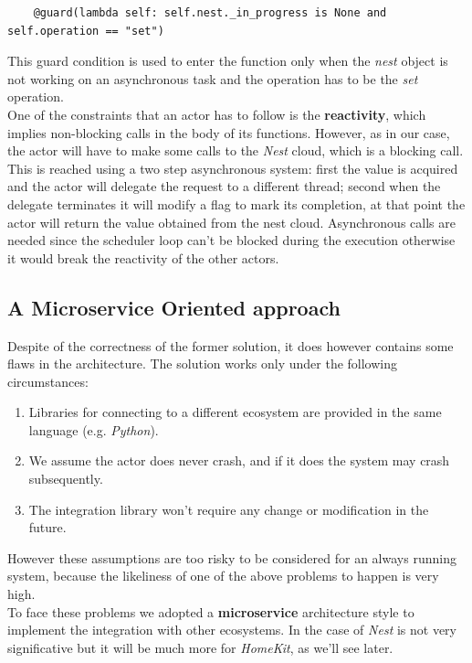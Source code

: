 \begin{verbatim}
    @guard(lambda self: self.nest._in_progress is None and self.operation == "set")
\end{verbatim}
This guard condition is used to enter the function only when the \textit{nest} object is not
working on an asynchronous task and the operation has to be the \textit{set} operation.\\
One of the constraints that an actor has to follow is the \textbf{reactivity}, which implies
non-blocking calls in the body of its functions. However, as in our case, the actor will have to
make some calls to the \textit{Nest} cloud, which is a blocking call. This is reached
using a two step asynchronous system: first the value is acquired and the actor
will delegate the request to a different thread; second when the delegate terminates it will
modify a flag to mark its completion, at that point the actor will return the value obtained
from the nest cloud. Asynchronous calls are needed since the scheduler loop can't be blocked
during the execution otherwise it would break the reactivity of the other actors.

\subsection{A Microservice Oriented approach}

Despite of the correctness of the former solution, it does however contains some
flaws in the architecture. The solution works only under the following circumstances:

\begin{enumerate}
    \item Libraries for connecting to a different ecosystem are provided in the same language (e.g. \textit{Python}).
    \item We assume the actor does never crash, and if it does the system may crash subsequently.
    \item The integration library won't require any change or modification in the future.
\end{enumerate}

However these assumptions are too risky to be considered for an always running system, because the likeliness
of one of the above problems to happen is very high.\\
To face these problems we adopted a \textbf{microservice} architecture style to implement the integration with
other ecosystems. In the case of \textit{Nest} is not very significative but it will be much more for \textit{HomeKit}, as
we'll see later.

